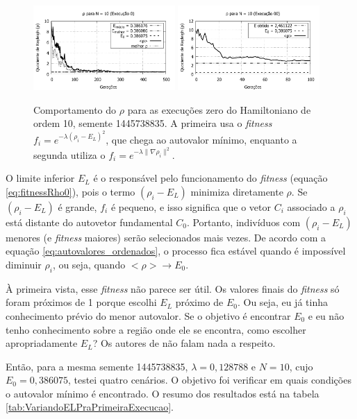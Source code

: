 	
	\begin{figure}[htbp]
		\centering
			\includegraphics[width=0.48\textwidth]{figs/resultados/fitnessEL/N-10_E-0_rho.pdf}
			\includegraphics[width=0.48\textwidth]{figs/resultados/fitnessGrad/N10_00_rho.pdf}
		\caption{Comportamento do $\rho$ para as execuções zero do Hamiltoniano de ordem 10, semente 1445738835. A primeira usa o \textit{fitness} $f_i = e^{-\lambda(\rho_i - E_L)^2}$, que chega ao autovalor mínimo, enquanto a segunda utiliza o $f_i = e^{-\lambda \| \nabla \rho_i \|^2}$.}
		\label{fig:N-10_E-0_rho_comparacao}
	\end{figure}	
	
	O limite inferior $E_L$ é o responsável pelo funcionamento do \emph{fitness} (equação \ref{eq:fitnessRho0}), pois o termo $(\rho_i - E_L)$ minimiza diretamente $\rho$. Se $(\rho_i - E_L)$ é grande, $f_i$ é pequeno, e isso significa que o vetor $C_i$ associado a $\rho_i$ está distante do autovetor fundamental $C_0$. Portanto, indivíduos com $(\rho_i - E_L)$ menores (e \emph{fitness} maiores) serão selecionados mais vezes. De acordo com a equação \ref{eq:autovalores_ordenados}, o processo fica estável quando é impossível diminuir $\rho_i$, ou seja, quando $<\rho> \rightarrow E_0$. 

	À primeira vista, esse \emph{fitness} não parece ser útil. Os valores finais do \emph{fitness} só foram próximos de 1 porque escolhi $E_L$ próximo de $E_0$. Ou seja, eu já tinha conhecimento prévio do menor autovalor. Se o objetivo é encontrar $E_0$ e eu não tenho conhecimento sobre a região onde ele se encontra, como escolher apropriadamente $E_L$? Os autores de \cite{metodo2011} não falam nada a respeito.
	
	Então, para a mesma semente 1445738835, $\lambda = 0,128788$ e $N = 10$, cujo $E_0 = 0,386075$, testei quatro cenários. O objetivo foi verificar em quais condições o autovalor mínimo é encontrado. O resumo dos resultados está na tabela \ref{tab:VariandoELPraPrimeiraExecucao}.
	
